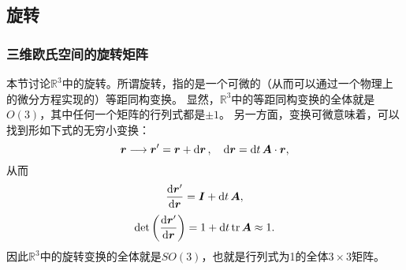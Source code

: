 \documentclass[hyperref, UTF8, a4paper]{ctexart}
\newcommand*{\reals}{\mathbb{R}}
\begin{document}
\subsection{旋转}\label{sec:rotation}

\subsubsection{三维欧氏空间的旋转矩阵}

本节讨论$\reals^3$中的旋转。所谓旋转，指的是一个可微的（从而可以通过一个物理上的微分方程实现的）等距同构变换。
显然，$\reals^3$中的等距同构变换的全体就是$O(3)$，其中任何一个矩阵的行列式都是$\pm 1$。
另一方面，变换可微意味着，可以找到形如下式的无穷小变换：
\[
    \vb*{r} \longrightarrow \vb*{r}' = \vb*{r} + \dd{\vb*{r}}, \quad \dd{\vb*{r}} = \dd{t} \vb*{A} \cdot \vb*{r},
\]
从而
\[
    \dv{\vb*{r}'}{\vb*{r}} = \vb*{I} + \dd{t} \vb*{A},
\]
\[
    \det \left( \dv{\vb*{r}'}{\vb*{r}} \right) = 1 + \dd{t} \trace \vb*{A} \approx 1.
\]
因此$\reals^3$中的旋转变换的全体就是$SO(3)$，也就是行列式为1的全体$3\times 3$矩阵。
\end{document}
